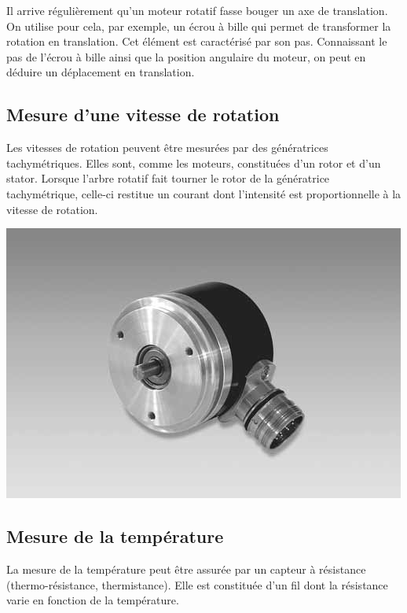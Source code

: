 \documentclass[10pt]{article}
\begin{document}
Il arrive régulièrement qu'un moteur rotatif fasse bouger un axe de translation. On utilise pour cela, par exemple, un écrou à bille qui permet de transformer la rotation en translation. Cet élément est caractérisé par son pas. Connaissant le pas de l'écrou à bille ainsi que la position angulaire du moteur, on peut en déduire un déplacement en translation.

\subsection{Mesure d'une vitesse de rotation}


\begin{minipage}[c]{.6\linewidth}
Les vitesses de rotation peuvent être mesurées par des génératrices tachymétriques. Elles sont, comme les moteurs, constituées d'un rotor et d'un stator. Lorsque l'arbre rotatif fait tourner le rotor de la génératrice tachymétrique, celle-ci restitue un courant dont l'intensité est proportionnelle à la vitesse de rotation.

\end{minipage}\hfill
\begin{minipage}[c]{.35\linewidth}
\begin{center}
    \includegraphics[width=.9\textwidth]{images/tachy.png}
\end{center}
\end{minipage}

\subsection{Mesure de la température}

La mesure de la température peut être assurée par un capteur à résistance (thermo-résistance, thermistance). Elle est constituée d'un fil dont la résistance varie en fonction de la température.
\end{document}

